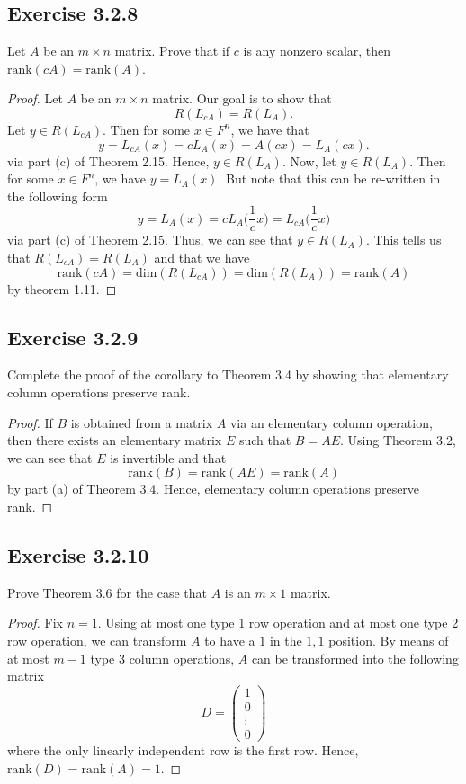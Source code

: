 \subsection*{Exercise 3.2.8} Let \( A  \) be an \( m \times n  \) matrix. Prove that if \( c  \) is any nonzero scalar, then \( \text{rank}(cA) = \text{rank}(A) \).
\begin{proof}
Let \( A  \) be an \( m \times n \) matrix. Our goal is to show that
\[  R({L}_{cA}) = R({L}_{A}). \] Let \( y \in R({L}_{cA}) \). Then for some \( x \in F^{n} \), we have that 
\[ y = {L}_{cA}(x) = c {L}_{A}(x) = A(cx) = {L}_{A}(cx).   \] via part (c) of Theorem 2.15. Hence, \( y \in R({L}_{A}) \). Now, let \( y \in R({L}_{A}) \). Then for some \( x \in F^{n} \), we have \( y = {L}_{A}(x) \). But note that this can be re-written in the following form 
\[  y = {L}_{A}(x) = c {L}_{A} \Big( \frac{ 1 }{ c }  x  \Big) = {L}_{cA} \Big( \frac{ 1 }{ c } x \Big)  \]
via part (c) of Theorem 2.15.
Thus, we can see that \( y \in R({L}_{A}) \). This tells us that \( R({L}_{cA}) = R({L}_{A}) \) and that we have
\[  \text{rank}(cA) = \text{dim}(R({L}_{cA})) = \text{dim}(R({L}_{A})) = \text{rank}(A) \]
by theorem 1.11.
\end{proof}
\subsection*{Exercise 3.2.9} Complete the proof of the corollary to Theorem 3.4 by showing that elementary column operations preserve rank.
\begin{proof}
If \( B  \) is obtained from a matrix \( A  \) via an elementary column operation, then there exists an elementary matrix \( E  \) such that \( B = AE  \). Using Theorem 3.2, we can see that \( E  \) is invertible and that 
\[  \text{rank}(B) = \text{rank}(AE) = \text{rank}(A) \] by part (a) of Theorem 3.4.
Hence, elementary column operations preserve rank.
\end{proof}

\subsection*{Exercise 3.2.10} Prove Theorem 3.6 for the case that \( A  \) is an \( m \times 1  \) matrix.
\begin{proof}
Fix \( n = 1  \). Using at most one type 1 row operation and at most one type 2 row operation, we can transform \( A  \) to have a \( 1  \) in the \( 1,1 \) position. By means of at most \( m - 1  \) type 3 column operations, \( A  \) can be transformed into the following matrix
\[  D = \begin{pmatrix} 
           1 \\
           0 \\
           \vdots \\
           0 
          \end{pmatrix} \] where the only linearly independent row is the first row. Hence, \( \text{rank}(D) = \text{rank}(A) = 1  \).
\end{proof}

